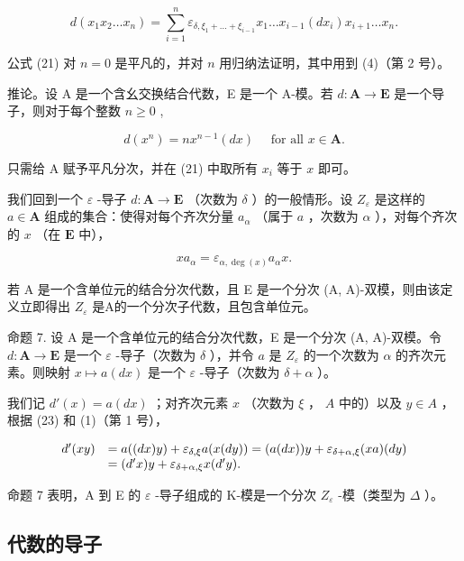 \[
d \left(x _ {1} x _ {2} \dots x _ {n}\right) = \sum_ {i = 1} ^ {n} \varepsilon_ {\delta, \xi_ {1} + \dots + \xi_ {i - 1}} x _ {1} \dots x _ {i - 1} \left(d x _ {i}\right) x _ {i + 1} \dots x _ {n}.\tag{21}
\]

公式 (21) 对 \(n = 0\) 是平凡的，并对 \(n\) 用归纳法证明，其中用到 (4)（第 2 号）。

推论。设 A 是一个含幺交换结合代数，E 是一个 A-模。若 \(d: \mathbf{A} \to \mathbf{E}\) 是一个导子，则对于每个整数 \(n \geqslant 0\) ,

\[
d (x ^ {n}) = n x ^ {n - 1} (d x) \quad \text { for all } x \in \mathbf {A}.\tag{22}
\]

只需给 A 赋予平凡分次，并在 (21) 中取所有 \(x_{i}\) 等于 \(x\) 即可。

我们回到一个 \(\varepsilon\) -导子 \(d: \mathbf{A} \to \mathbf{E}\) （次数为 \(\delta\) ）的一般情形。设 \(Z_{\varepsilon}\) 是这样的 \(a \in \mathbf{A}\) 组成的集合：使得对每个齐次分量 \(a_{\alpha}\) （属于 \(a\) ，次数为 \(\alpha\) ），对每个齐次的 \(x\) （在 \(\mathbf{E}\) 中），

\[
x a _ {\alpha} = \varepsilon_ {\alpha , \deg (x)} a _ {\alpha} x.\tag{23}
\]

若 A 是一个含单位元的结合分次代数，且 E 是一个分次 (A, A)-双模，则由该定义立即得出 \(Z_{\varepsilon}\) 是A的一个分次子代数，且包含单位元。

命题 7. 设 A 是一个含单位元的结合分次代数，E 是一个分次 (A, A)-双模。令 \(d: \mathbf{A} \to \mathbf{E}\) 是一个 \(\varepsilon\) -导子（次数为 \(\delta\) ），并令 \(a\) 是 \(Z_{\varepsilon}\) 的一个次数为 \(\alpha\) 的齐次元素。则映射 \(x \mapsto a(dx)\) 是一个 \(\varepsilon\) -导子（次数为 \(\delta + \alpha\) ）。

我们记 \(d'(x) = a(dx)\) ；对齐次元素 \(x\) （次数为 \(\xi\) ， \(A\) 中的）以及 \(y \in A\) ，根据 (23) 和 (1)（第 1 号），

\[
\begin{array}{r l} d ^ {\prime} (x y) & = a ((d x) y) + \varepsilon_ {\delta , \xi} a (x (d y)) = (a (d x)) y + \varepsilon_ {\delta + \alpha , \xi} (x a) (d y) \\ & = (d ^ {\prime} x) y + \varepsilon_ {\delta + \alpha , \xi} x (d ^ {\prime} y). \end{array}
\]

命题 7 表明，A 到 E 的 \(\varepsilon\) -导子组成的 K-模是一个分次 \(Z_{\varepsilon}\) -模（类型为 \(\Delta\) ）。

\subsection{代数的导子}

